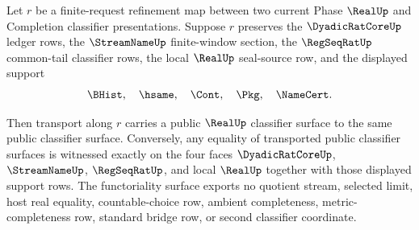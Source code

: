 \begin{theorem}
\label{thm:real-l10-four-face-classifier-functoriality}
Let $r$ be a finite-request refinement map between two current Phase $\RealUp$ and Completion classifier presentations. Suppose $r$ preserves the $\DyadicRatCoreUp$ ledger rows, the $\StreamNameUp$ finite-window section, the $\RegSeqRatUp$ common-tail classifier rows, the local $\RealUp$ seal-source row, and the displayed support
$$
\BHist,\quad \hsame,\quad \Cont,\quad \Pkg,\quad \NameCert.
$$

Then transport along $r$ carries a public $\RealUp$ classifier surface to the same public classifier surface. Conversely, any equality of transported public classifier surfaces is witnessed exactly on the four faces $\DyadicRatCoreUp$, $\StreamNameUp$, $\RegSeqRatUp$, and local $\RealUp$ together with those displayed support rows. The functoriality surface exports no quotient stream, selected limit, host real equality, countable-choice row, ambient completeness, metric-completeness row, standard bridge row, or second classifier coordinate.
\end{theorem}
